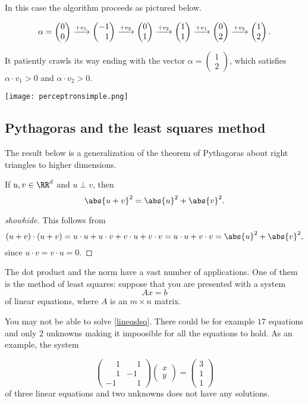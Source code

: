 \documentclass{article}
\newcommand{\vect}[2]{\begin{pmatrix} #1 \\ #2 \end{pmatrix}}
\newcommand{\hphm}{\hphantom{-}}
\begin{document}
\begin{example}
In this case the algorithm proceeds as pictured below.



$$
\alpha = \vect{0}{0}\xrightarrow{+v_1} \vect{-1}{\hphm 1} \xrightarrow{+v_2} \vect{0}{1} \xrightarrow{+v_2}\vect{1}{1} \xrightarrow{+v_1}\vect{0}{2} \xrightarrow{+v_2} \vect{1}{2}.
$$

It patiently crawls its way ending with the vector $\alpha = \vect{1}{2}$, which
satisfies $\alpha\cdot v_1 > 0$ and $\alpha\cdot v_2 > 0$.

\texttt{[image: perceptronsimple.png]}

\end{example}

\subsection{Pythagoras and the least squares method}

The result below is a generalization of the theorem of Pythagoras about right
triangles to higher dimensions.

\begin{proposition}\label{proppythagoras}
  If $u, v\in \RR^d$ and $u\perp v$, then
  $$
  \abs{u + v}^2 = \abs{u}^2 + \abs{v}^2.
  $$
\end{proposition}

  \begin{proof}[showhide]
    This follows from
    $$
    (u + v)\cdot(u+v) = u\cdot u + u\cdot v + v\cdot u + v\cdot v = u\cdot u + v\cdot v = \abs{u}^2 + \abs{v}^2,
    $$
    since $u \cdot v = v\cdot u = 0$.
  \end{proof}




The dot product and the norm have a vast number of applications. One of them is the
method of least squares: suppose that you are presented with a system
\begin{equation}\label{lineqslsq}
A x = b
\end{equation}
of linear equations, where $A$ is an $m\times n$ matrix.

You may not be able to solve \eqref{lineqslsq}. There could be for example
$17$ equations and only $2$ unknowns making it impoosible for all the equations to hold.
As an example, the system

\newcommand{\mph}{\phantom{-}}

\begin{equation}\label{nosols}
\begin{pmatrix}
\mph 1 & \mph 1\\
\mph 1 & -1\\
-1 & \mph 1
\end{pmatrix} \begin{pmatrix} x \\ y\end{pmatrix} = \begin{pmatrix} 3 \\ 1 \\ 1 \end{pmatrix}
\end{equation}
of three linear equations and two unknowns does not have any solutions.
\end{document}

